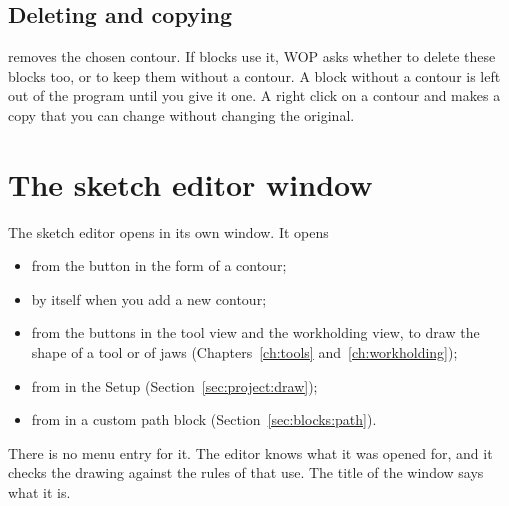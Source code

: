 \subsection{Deleting and copying}
 removes the chosen contour. If blocks use it, WOP asks whether to delete these blocks too, or to keep them without a contour. A block without a contour is left out of the program until you give it one. A right click on a contour and  makes a copy that you can change without changing the original.

\section{The sketch editor window}\label{sec:sketch:window}

The sketch editor opens in its own window. It opens

\begin{itemize}
\item from the button  in the form of a contour;
\item by itself when you add a new contour;
\item from the buttons in the tool view and the workholding view, to draw the shape of a tool or of jaws (Chapters~\ref{ch:tools} and~\ref{ch:workholding});
\item from  in the Setup (Section~\ref{sec:project:draw});
\item from  in a custom path block (Section~\ref{sec:blocks:path}).
\end{itemize}

There is no menu entry for it. The editor knows what it was opened for, and it checks the drawing against the rules of that use. The title of the window says what it is.


